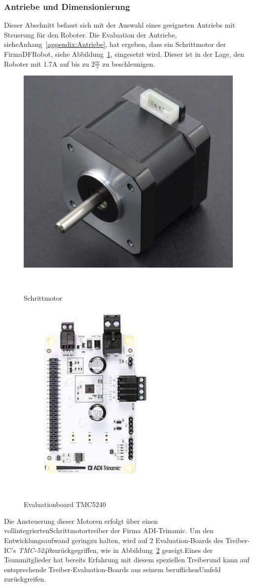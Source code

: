 \documentclass[main.tex]{subfiles} %
\begin{document}

\subsubsection{Antriebe und Dimensionierung}

Dieser Abschnitt befasst sich mit der Auswahl eines geeigneten Antriebs mit
Steuerung für den Roboter. Die Evaluation der Antriebe,
sieheAnhang~\ref{appendix:Antriebe}, hat ergeben, dass ein Schrittmotor der
FirmaDFRobot, siehe Abbildung~\ref{Schrittmotor_FIT0278}, eingesetzt wird.
Dieser ist in der Lage, den Roboter mit 1.7A auf bis zu $2\frac{m}{s}$ zu
beschleunigen.
\begin{figure}[H]
    \centering
    \includegraphics[width = 0.25 \linewidth]{fig_Antriebe_und_Dimensionierung/DFRobot_Stepper_FIT0278.png}
    \caption{Schrittmotor}~\label{Schrittmotor_FIT0278}
\end{figure}

\begin{figure}[H]
    \centering
    \includegraphics[width = 0.25 \linewidth]{fig_Antriebe_und_Dimensionierung/TMC_5240_EVAL.png}
    \caption{Evaluationboard TMC5240}~\label{Schrittmotorentreiber_EVAL}
\end{figure}

Die Ansteuerung dieser Motoren erfolgt über einen
vollintegriertenSchrittmotortreiber der Firma ADI-Trinamic. Um den
Entwicklungsaufwand geringzu halten, wird auf 2 Evaluation-Boards des
Treiber-IC's \textit{TMC-5240}zurückgegriffen, wie in
Abbildung~\ref{Schrittmotorentreiber_EVAL} gezeigt.Eines der Teammitglieder hat
bereits Erfahrung mit diesem speziellen Treiberund kann auf entsprechende
Treiber-Evaluation-Boards aus seinem beruflichenUmfeld zurückgreifen.
\end{document}
